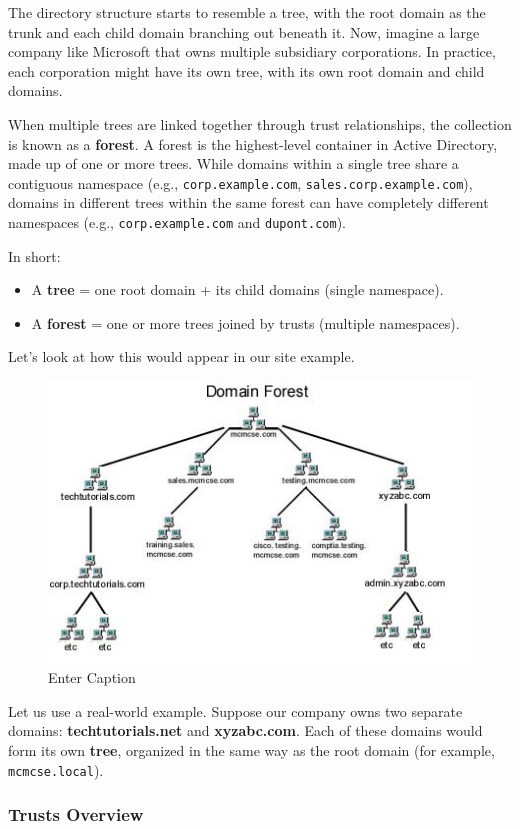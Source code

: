 The directory structure starts to resemble a tree, with the root domain as the trunk and each child domain branching out beneath it. Now, imagine a large company like Microsoft that owns multiple subsidiary corporations. In practice, each corporation might have its own tree, with its own root domain and child domains.

When multiple trees are linked together through trust relationships, the collection is known as a \textbf{forest}. A forest is the highest-level container in Active Directory, made up of one or more trees. While domains within a single tree share a contiguous namespace (e.g., \verb|corp.example.com|, \verb|sales.corp.example.com|), domains in different trees within the same forest can have completely different namespaces (e.g., \verb|corp.example.com| and \verb|dupont.com|).

In short:
\begin{itemize}
    \item A \textbf{tree} = one root domain + its child domains (single namespace).
    \item A \textbf{forest} = one or more trees joined by trusts (multiple namespaces).
\end{itemize}
Let’s look at how this would appear in our site example.
\begin{figure}
    \centering
    \includegraphics[width=0.75\linewidth]{ad3.png}
    \caption{Enter Caption}
    \label{fig:placeholder}
\end{figure}

Let us use a real-world example. Suppose our company owns two separate domains: \textbf{techtutorials.net} and \textbf{xyzabc.com}. Each of these domains would form its own \textbf{tree}, organized in the same way as the root domain (for example, \verb|mcmcse.local|).

\subsubsection{Trusts Overview}

